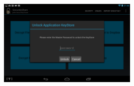 \begin{figure}[h!]
    \centering
    \includegraphics[width=0.6\textwidth]{Unlock}                                                                                                                                                                                                                                                                                                                                                                                                                                                                                                                                                                                                                                                                                                                                                                                                                                                                                                                                                                                                                                                                                                                                                                                                                                                                                                                                                                                                                                                                                                                                                                                                                                                                                                                                                                                                                                                                                                                                                                                                                                                                                                                                                                                                                                                                                                                                                                                                                                                                                                                                              
\end{figure}
